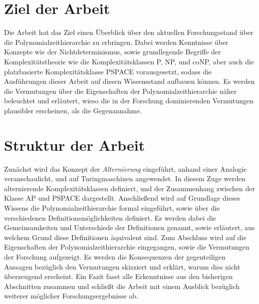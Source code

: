 \section{Ziel der Arbeit}
Die Arbeit hat das Ziel einen Überblick über den aktuellen Forschungsstand über die Polynomialzeithierarchie zu erbringen. Dabei werden Kenntnisse über Konzepte wie der Nichtdeterminismus, sowie grundlegende Begriffe der Komplexitätstheorie
wie die Komplexitätsklassen P, NP, und coNP, aber auch die platzbasierte Komplexitätsklasse PSPACE vorausgesetzt, sodass die Ausführungen dieser Arbeit auf diesen Wissensstand aufbauen können.
Es werden die Vermutungen über die Eigenschaften der Polynomialzeithierarchie näher beleuchtet und erläutert, wieso die in der Forschung dominierenden Vermutungen plausibler erscheinen, als die Gegenannahme.

\section{Struktur der Arbeit}
Zunächst wird das Konzept der \emph{Alternierung} eingeführt, anhand einer Analogie veranschaulicht, und auf Turingmaschinen angewendet. In diesem Zuge werden alternierende Komplexitätsklassen definiert, und der Zusammenhang 
zwischen der Klasse AP und PSPACE dargestellt. Anschließend wird auf Grundlage dieses Wissens die Polynomialzeithierarchie formal eingeführt, sowie über die verschiedenen Definitionsmöglichkeiten definiert.
Es werden dabei die Gemeinsamkeiten und Unterschiede der Definitionen genannt, sowie erläutert, aus welchem Grund diese Definitionen äquivalent sind.
Zum Abschluss wird auf die Eigenschaften der Polynomialzeithierarchie eingegangen, sowie die Vermutungen der Forschung aufgezeigt. 
Es werden die Konsequenzen der gegenteiligen Aussagen bezüglich den Vermutungen skizziert und erklärt, warum dies nicht überzeugend erscheint.
Ein Fazit fasst alle Erkenntnisse aus den bisherigen Abschnitten zusammen und schließt die Arbeit mit einem Ausblick bezüglich weiterer möglicher Forschungsergebnisse ab.





